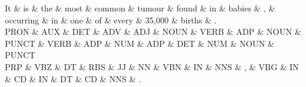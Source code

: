 
\begin{dependency}
\begin{deptext}
It \& is \& the \& most \& common \& tumour \& found \& in \& babies \& , \& occurring \& in \& one \& of \& every \& 35,000 \& births \& . \\
PRON \& AUX \& DET \& ADV \& ADJ \& NOUN \& VERB \& ADP \& NOUN \& PUNCT \& VERB \& ADP \& NUM \& ADP \& DET \& NUM \& NOUN \& PUNCT \\
PRP \& VBZ \& DT \& RBS \& JJ \& NN \& VBN \& IN \& NNS \& , \& VBG \& IN \& CD \& IN \& DT \& CD \& NNS \& . \\
\end{deptext}



\end{dependency}
